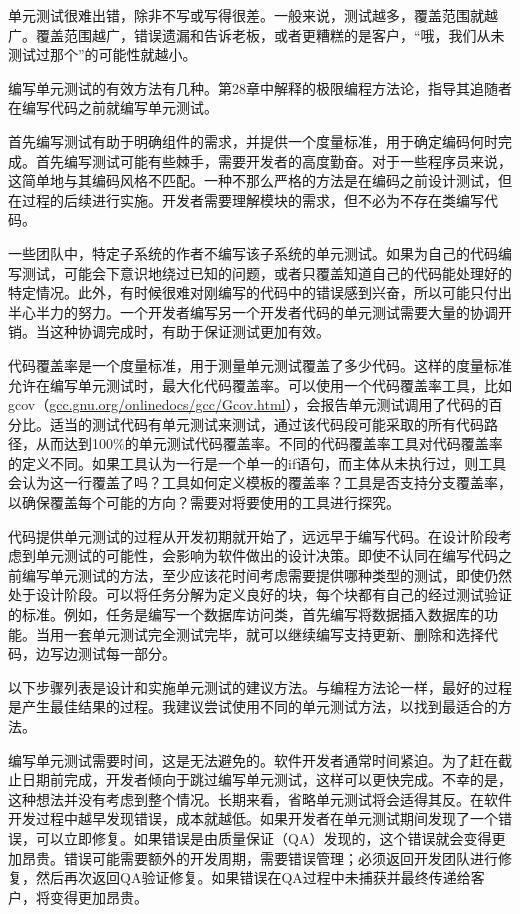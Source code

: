 
单元测试很难出错，除非不写或写得很差。一般来说，测试越多，覆盖范围就越广。覆盖范围越广，错误遗漏和告诉老板，或者更糟糕的是客户，“哦，我们从未测试过那个”的可能性就越小。

编写单元测试的有效方法有几种。第28章中解释的极限编程方法论，指导其追随者在编写代码之前就编写单元测试。

首先编写测试有助于明确组件的需求，并提供一个度量标准，用于确定编码何时完成。首先编写测试可能有些棘手，需要开发者的高度勤奋。对于一些程序员来说，这简单地与其编码风格不匹配。一种不那么严格的方法是在编码之前设计测试，但在过程的后续进行实施。开发者需要理解模块的需求，但不必为不存在类编写代码。

一些团队中，特定子系统的作者不编写该子系统的单元测试。如果为自己的代码编写测试，可能会下意识地绕过已知的问题，或者只覆盖知道自己的代码能处理好的特定情况。此外，有时候很难对刚编写的代码中的错误感到兴奋，所以可能只付出半心半力的努力。一个开发者编写另一个开发者代码的单元测试需要大量的协调开销。当这种协调完成时，有助于保证测试更加有效。

代码覆盖率是一个度量标准，用于测量单元测试覆盖了多少代码。这样的度量标准允许在编写单元测试时，最大化代码覆盖率。可以使用一个代码覆盖率工具，比如 gcov（\url{gcc.gnu.org/onlinedocs/gcc/Gcov.html}），会报告单元测试调用了代码的百分比。适当的测试代码有单元测试来测试，通过该代码段可能采取的所有代码路径，从而达到100\%的单元测试代码覆盖率。不同的代码覆盖率工具对代码覆盖率的定义不同。如果工具认为一行是一个单一的if语句，而主体从未执行过，则工具会认为这一行覆盖了吗？工具如何定义模板的覆盖率？工具是否支持分支覆盖率，以确保覆盖每个可能的方向？需要对将要使用的工具进行探究。


代码提供单元测试的过程从开发初期就开始了，远远早于编写代码。在设计阶段考虑到单元测试的可能性，会影响为软件做出的设计决策。即使不认同在编写代码之前编写单元测试的方法，至少应该花时间考虑需要提供哪种类型的测试，即使仍然处于设计阶段。可以将任务分解为定义良好的块，每个块都有自己的经过测试验证的标准。例如，任务是编写一个数据库访问类，首先编写将数据插入数据库的功能。当用一套单元测试完全测试完毕，就可以继续编写支持更新、删除和选择代码，边写边测试每一部分。

以下步骤列表是设计和实施单元测试的建议方法。与编程方法论一样，最好的过程是产生最佳结果的过程。我建议尝试使用不同的单元测试方法，以找到最适合的方法。


编写单元测试需要时间，这是无法避免的。软件开发者通常时间紧迫。为了赶在截止日期前完成，开发者倾向于跳过编写单元测试，这样可以更快完成。不幸的是，这种想法并没有考虑到整个情况。长期来看，省略单元测试将会适得其反。在软件开发过程中越早发现错误，成本就越低。如果开发者在单元测试期间发现了一个错误，可以立即修复。如果错误是由质量保证（QA）发现的，这个错误就会变得更加昂贵。错误可能需要额外的开发周期，需要错误管理；必须返回开发团队进行修复，然后再次返回QA验证修复。如果错误在QA过程中未捕获并最终传递给客户，将变得更加昂贵。

